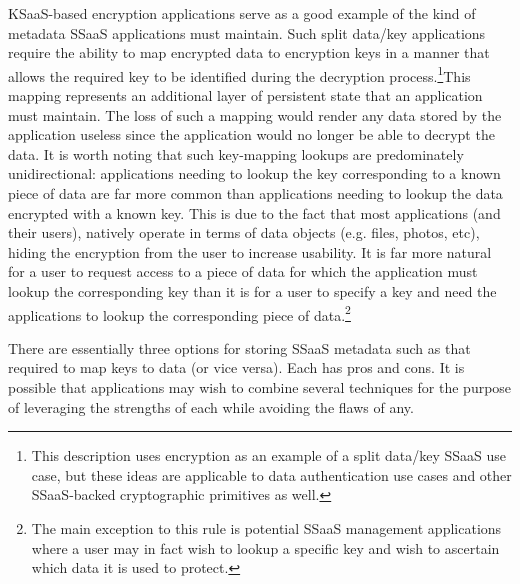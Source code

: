 KSaaS-based encryption applications serve as a good example of the
kind of metadata SSaaS applications must maintain. Such split data/key
applications require the ability to map encrypted data to encryption
keys in a manner that allows the required key to be identified during
the decryption process.\footnote{This description uses encryption as
  an example of a split data/key SSaaS use case, but these ideas are
  applicable to data authentication use cases and other SSaaS-backed
  cryptographic primitives as well.}This mapping represents an
additional layer of persistent state that an application must
maintain. The loss of such a mapping would render any data stored by
the application useless since the application would no longer be able
to decrypt the data. It is worth noting that such key-mapping lookups
are predominately unidirectional: applications needing to lookup the
key corresponding to a known piece of data are far more common than
applications needing to lookup the data encrypted with a known
key. This is due to the fact that most applications (and their users),
natively operate in terms of data objects (e.g. files, photos, etc),
hiding the encryption from the user to increase usability. It is far
more natural for a user to request access to a piece of data for which
the application must lookup the corresponding key than it is for a
user to specify a key and need the applications to lookup the
corresponding piece of data.\footnote{The main exception to this rule
  is potential SSaaS management applications where a user may in fact
  wish to lookup a specific key and wish to ascertain which data it is
  used to protect.}

There are essentially three options for storing SSaaS metadata such as
that required to map keys to data (or vice versa). Each has pros and
cons. It is possible that applications may wish to combine several
techniques for the purpose of leveraging the strengths of each while
avoiding the flaws of any.

